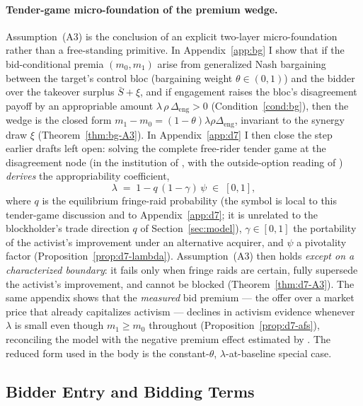 \documentclass[11pt]{article}
\newcommand{\1}{\mathbf{1}}
\begin{document}
\paragraph{Tender-game micro-foundation of the premium wedge.} Assumption~\textup{(A3)} is the conclusion of an explicit two-layer micro-foundation rather than a free-standing primitive. In Appendix~\ref{app:bg} I show that if the bid-conditional premia $(m_0,m_1)$ arise from generalized Nash bargaining between the target's control bloc (bargaining weight $\theta\in(0,1)$) and the bidder over the takeover surplus $\bar S+\xi$, and if engagement raises the bloc's disagreement payoff by an appropriable amount $\lambda\,\rho\,\Delta_{\mathrm{eng}}>0$ (Condition~\ref{cond:bg}), then the wedge is the closed form $m_1-m_0=(1-\theta)\lambda\rho\Delta_{\mathrm{eng}}$, invariant to the synergy draw $\xi$ (Theorem~\ref{thm:bg-A3}). In Appendix~\ref{app:d7} I then close the step earlier drafts left open: solving the complete free-rider tender game at the disagreement node (in the institution of \citet{GrossmanHart1980}, with the outside-option reading of \citet{BinmoreRubinsteinWolinsky1986}) \emph{derives} the appropriability coefficient,
\[
\lambda \;=\; 1-q\,(1-\gamma)\,\psi\;\in\;[0,1],
\]
where $q$ is the equilibrium fringe-raid probability (the symbol is local to this tender-game discussion and to Appendix~\ref{app:d7}; it is unrelated to the blockholder's trade direction $q$ of Section~\ref{sec:model}), $\gamma\in[0,1]$ the portability of the activist's improvement under an alternative acquirer, and $\psi$ a pivotality factor (Proposition~\ref{prop:d7-lambda}). Assumption~\textup{(A3)} then holds \emph{except on a characterized boundary}: it fails only when fringe raids are certain, fully supersede the activist's improvement, and cannot be blocked (Theorem~\ref{thm:d7-A3}). The same appendix shows that the \emph{measured} bid premium --- the offer over a market price that already capitalizes activism --- declines in activism evidence whenever $\lambda$ is small even though $m_1\ge m_0$ throughout (Proposition~\ref{prop:d7-afs}), reconciling the model with the negative premium effect estimated by \citet{CelentanoLevine2025}. The reduced form used in the body is the constant-$\theta$, $\lambda$-at-baseline special case.

%
\subsection{Bidder Entry and Bidding Terms}
%
\end{document}
